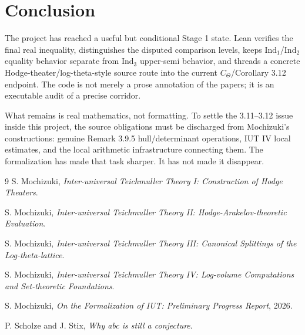 \documentclass[11pt]{article}
\newcommand{\IUT}{IUT}
\newcommand{\CTheta}{C_\Theta}
\newcommand{\IndOne}{\ensuremath{\mathrm{Ind}_1}}
\newcommand{\IndTwo}{\ensuremath{\mathrm{Ind}_2}}
\newcommand{\IndThree}{\ensuremath{\mathrm{Ind}_3}}
\theoremstyle{plain}
\theoremstyle{definition}
\theoremstyle{remark}
\begin{document}
\section{Conclusion}

The project has reached a useful but conditional Stage 1 state.  Lean verifies
the final real inequality, distinguishes the disputed comparison levels, keeps
\IndOne/\IndTwo{} equality behavior separate from \IndThree{} upper-semi
behavior, and threads a concrete Hodge-theater/log-theta-style source route
into the current \(\CTheta\)/Corollary 3.12 endpoint.  The code is not merely a
prose annotation of the papers; it is an executable audit of a precise corridor.

What remains is real mathematics, not formatting.  To settle the 3.11--3.12
issue inside this project, the source obligations must be discharged from
Mochizuki's constructions: genuine Remark 3.9.5 hull/determinant operations,
\IUT{} IV local estimates, and the
local arithmetic infrastructure connecting them.  The formalization has made
that task sharper.  It has not made it disappear.

\begingroup
\small
\begin{thebibliography}{9}
S. Mochizuki, \emph{Inter-universal Teichmuller Theory I:
Construction of Hodge Theaters}.

S. Mochizuki, \emph{Inter-universal Teichmuller Theory II:
Hodge-Arakelov-theoretic Evaluation}.

S. Mochizuki, \emph{Inter-universal Teichmuller Theory III:
Canonical Splittings of the Log-theta-lattice}.

S. Mochizuki, \emph{Inter-universal Teichmuller Theory IV:
Log-volume Computations and Set-theoretic Foundations}.

S. Mochizuki, \emph{On the Formalization of IUT: Preliminary Progress Report},
2026.

P. Scholze and J. Stix, \emph{Why abc is still a conjecture}.
\end{thebibliography}
\endgroup
\end{document}
